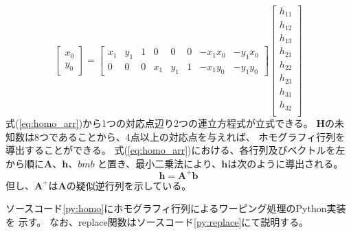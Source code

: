 \begin{equation}\label{eq:homo_arr}
    \begin{bmatrix}
        x_0 \\ 
        y_0
    \end{bmatrix}
    =
    \begin{bmatrix} 
        x_1 & y_1 & 1 & 0 & 0 & 0 & -x_1 x_0 & -y_1 x_0 \\
        0 & 0 & 0 & x_1 & y_1 & 1 & -x_1 y_0 & -y_1 y_0
    \end{bmatrix} 
    \begin{bmatrix}
        h_{11} \\ h_{12} \\ h_{13} \\
        h_{21} \\ h_{22} \\ h_{23} \\
        h_{31} \\ h_{32} \\
    \end{bmatrix}
\end{equation}
式(\ref{eq:homo_arr})から1つの対応点辺り2つの連立方程式が立式できる。
$\bm{H}$の未知数は8つであることから、4点以上の対応点を与えれば、
ホモグラフィ行列を導出することができる。
式(\ref{eq:homo_arr})における、各行列及びベクトルを左から順に$\bm{A}$、$\bm{h}$、$bm{b}$
と置き、最小二乗法により、$\bm{h}$は次のように導出される。
\begin{equation}\label{eq:solv}
    \bm{h} = \bm{A}^{+} \bm{b}
\end{equation}
但し、$\bm{A}^{+}$は$\bm{A}$の疑似逆行列を示している。

ソースコード\ref{py:homo}にホモグラフィ行列によるワーピング処理のPython実装を
示す。
なお、replace関数はソースコード\ref{py:replace}にて説明する。

